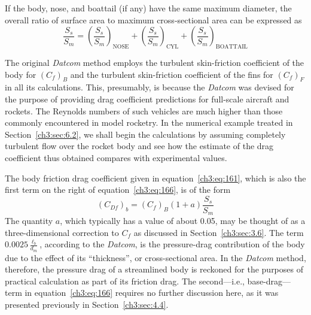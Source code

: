 If the body, nose, and boattail (if any) have the same maximum diameter, the
overall ratio of surface area to maximum cross-sectional area can be expressed
as
\begin{equation}\label{ch3:eq:173}
\frac{S_s}{S_m} = \left(\frac{S_s}{S_m}\right)_{\mathrm{NOSE}}
  + \left(\frac{S_s}{S_m}\right)_{\mathrm{CYL}}
  + \left(\frac{S_s}{S_m}\right)_{\mathrm{BOATTAIL}}
\end{equation}

The original \emph{Datcom} method employs the turbulent skin-friction
coefficient of the body for $(C_f)_B$ and the turbulent skin-friction
coefficient of the fins for $(C_f)_F$ in all its calculations. This,
presumably, is because the \emph{Datcom} was devised for the purpose of
providing drag coefficient predictions for full-scale aircraft and rockets.
The Reynolds numbers of such vehicles are much higher than those commonly
encountered in model rocketry. In the numerical example treated in
Section~\ref{ch3:sec:6.2}, we shall begin the calculations by assuming
completely turbulent flow over the rocket body and see how the estimate of the
drag coefficient thus obtained compares with experimental values.

The body friction drag coefficient given in equation~\eqref{ch3:eq:161},
which is also the first term on the right of equation~\eqref{ch3:eq:166}, is
of the form
\begin{equation}\label{ch3:eq:174}
(C_{Df})_b = (C_f)_B(1 + a)\frac{S_s}{S_m}
\end{equation}
The quantity $a$, which typically has a value of about 0.05, may be thought of
as a three-dimensional correction to $C_f$ as discussed in
Section~\ref{ch3:sec:3.6}. The term $0.0025\frac{\ell_b}{d_m}$, according to
the \emph{Datcom}, is the pressure-drag contribution of the body due to the
effect of its ``thickness'', or cross-sectional area. In the \emph{Datcom}
method, therefore, the pressure drag of a streamlined body is reckoned for the
purposes of practical calculation as part of its friction drag. The
second---i.e., base-drag---term in equation~\eqref{ch3:eq:166} requires no
further discussion here, as it was presented previously in
Section~\ref{ch3:sec:4.4}.
